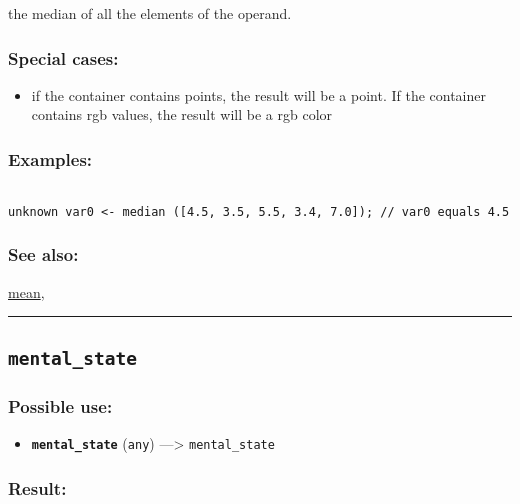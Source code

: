 \documentclass[]{book}
\providecommand{\tightlist}{%
  \setlength{\itemsep}{0pt}\setlength{\parskip}{0pt}}
\theoremstyle{definition}
\theoremstyle{definition}
\theoremstyle{definition}
\theoremstyle{remark}
\begin{document}
the median of all the elements of the operand.

\subsubsection{Special cases:}\label{special-cases-97}

\begin{itemize}
\tightlist
\item
  if the container contains points, the result will be a point. If the
  container contains rgb values, the result will be a rgb color
\end{itemize}

\subsubsection{Examples:}\label{examples-240}

\begin{verbatim}
 
unknown var0 <- median ([4.5, 3.5, 5.5, 3.4, 7.0]); // var0 equals 4.5
\end{verbatim}

\subsubsection{See also:}\label{see-also-140}

\href{OperatorsIM\#mean}{mean},

\begin{center}\rule{0.5\linewidth}{\linethickness}\end{center}

\subsection{\texorpdfstring{\texttt{mental\_state}}{mental\_state}}\label{mental_state}

\subsubsection{Possible use:}\label{possible-use-348}

\begin{itemize}
\tightlist
\item
  \textbf{\texttt{mental\_state}} (\texttt{any}) ---\textgreater{}
  \texttt{mental\_state}
\end{itemize}

\subsubsection{Result:}\label{result-337}
\end{document}
